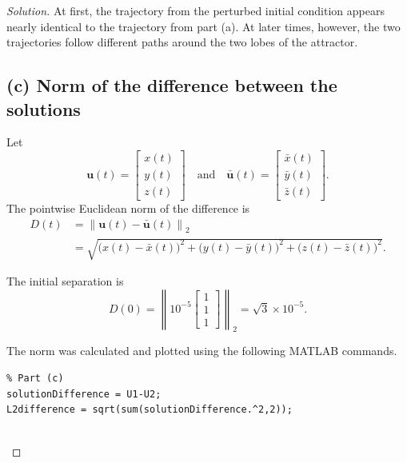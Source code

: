 \documentclass[12pt]{amsart}
\newenvironment{solution}
{\begin{proof}[Solution]}
{\end{proof}}
\begin{document}
\begin{onehalfspace}
\begin{solution}
            At first, the trajectory from the perturbed initial condition appears
            nearly identical to the trajectory from part (a). At later times,
            however, the two trajectories follow different paths around the two
            lobes of the attractor.

            \subsection*{(c) Norm of the difference between the solutions}

            Let
            \[
                \mathbf{u}(t)=
                \begin{bmatrix}
                    x(t)\\y(t)\\z(t)
                \end{bmatrix}
                \quad\text{and}\quad
                \bar{\mathbf{u}}(t)=
                \begin{bmatrix}
                    \bar{x}(t)\\\bar{y}(t)\\\bar{z}(t)
                \end{bmatrix}.
            \]
            The pointwise Euclidean norm of the difference is
            \begin{align}
                D(t)
                &=\left\|\mathbf{u}(t)-\bar{\mathbf{u}}(t)\right\|_2 \\
                &=\sqrt{
                    \bigl(x(t)-\bar{x}(t)\bigr)^2+
                    \bigl(y(t)-\bar{y}(t)\bigr)^2+
                    \bigl(z(t)-\bar{z}(t)\bigr)^2
                }.
            \end{align}

            The initial separation is
            \[
                D(0)
                =
                \left\|
                    10^{-5}
                    \begin{bmatrix}
                        1\\1\\1
                    \end{bmatrix}
                \right\|_2
                =
                \sqrt{3}\times10^{-5}.
            \]

            The norm was calculated and plotted using the following MATLAB commands.

            \begin{lstlisting}
% Part (c)
solutionDifference = U1-U2;
L2difference = sqrt(sum(solutionDifference.^2,2));


\end{lstlisting}
\end{solution}
\end{onehalfspace}
\end{document}
